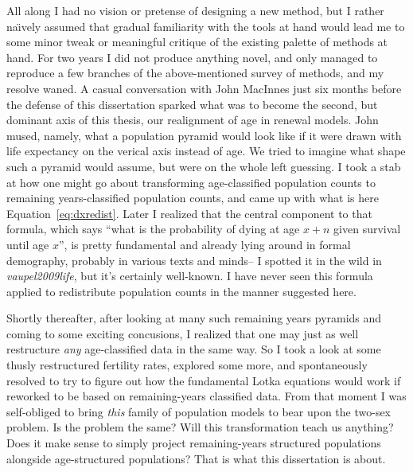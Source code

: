 All along I had no vision or pretense of designing a new method, but I rather
na\"{\i}vely assumed that gradual familiarity with the tools at hand would lead
me to some minor tweak or meaningful critique of the existing palette of methods at
hand. For two years I did not produce anything novel, and only managed to
reproduce a few branches of the above-mentioned survey of methods, and my
resolve waned. A casual conversation with John MacInnes just six months before
the defense of this dissertation sparked what was to become the second, but
dominant axis of this thesis, our realignment of age in renewal models. John
mused, namely, what a population pyramid would look like if it were drawn with
life expectancy on the verical axis instead of age. We tried to imagine what
shape such a pyramid would assume, but were on the whole left guessing. I took a
stab at how one might go about transforming age-classified population counts to
remaining years-classified population counts, and came up with what is here
Equation~\ref{eq:dxredist}. Later I realized that the central component to that
formula, which says ``what is the probability of dying at age $x+n$ given
survival until age $x$'', is pretty fundamental and already lying around in
formal demography, probably in various texts and minds-- I spotted it in the
wild in \textit{vaupel2009life}, but it's certainly well-known. I have never
seen this formula applied to redistribute population counts in the manner
suggested here.

Shortly thereafter, after looking at many such remaining years pyramids and
coming to some exciting concusions, I realized that one may just as well
restructure \textit{any} age-classified data in the same way. So I took a 
look at some thusly restructured fertility rates, explored
some more, and spontaneously resolved to try to figure out how the fundamental
Lotka equations would work if reworked to be based on remaining-years classified
data. From that moment I was self-obliged to bring \textit{this} family of
population models to bear upon the two-sex problem. Is the problem the same?
Will this transformation teach us anything? Does it make sense to simply
project remaining-years structured populations alongside age-structured
populations? That is what this dissertation is about.

